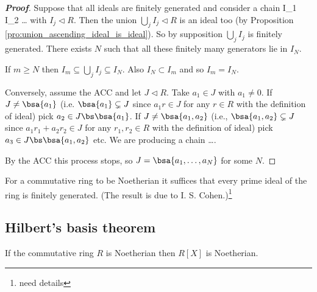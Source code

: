 \begin{proof}[\bf Proof]
Suppose that all ideals are finitely generated and consider a chain
\be
I_1 \subseteq I_2 \subseteq \dots
\ee
with $I_j \lhd R$. Then the union $\bigcup_j I_j \lhd R$ is an ideal too (by Proposition \ref{pro:union_ascending_ideal_is_ideal}). So by supposition $\bigcup_j I_j$ is finitely generated. There exists $N$ such that all these finitely many generators lie in $I_N$.

If $m \geq N$ then $I_m \subseteq \bigcup_j I_j \subseteq I_N$. Also $I_N \subset I_m$ and so $I_m = I_N$.

Conversely, assume the ACC and let $J \lhd R$. Take $a_1\in J$ with $a_1 \neq 0$. If $J \neq \bsa{a_1}$ (i.e. $\bsa{a_1} \subsetneq J$ since $a_1 r \in J$ for any $r\in R$ with the definition of ideal) pick $a_2 \in J \bs \bsa{a_1}$. If $J \neq \bsa{a_1, a_2}$ (i.e., $\bsa{a_1,a_2} \subsetneq J$ since $a_1 r_1 + a_2 r_2  \in J$ for any $r_1,r_2\in R$ with the definition of ideal) pick $a_3 \in J \bs \bsa{a_1, a_2}$ etc. We are producing a chain
\be
{} \subsetneq {} \subsetneq {} \subsetneq \dots .
\ee

By the ACC this process stops, so $J = \bsa{a_1,\dots , a_N}$ for some $N$.
\end{proof}

\begin{remark}
For a commutative ring to be Noetherian it suffices that every prime ideal of the ring is finitely generated. (The result is due to I. S. Cohen.)\footnote{need details}
\end{remark}


\subsection{Hilbert's basis theorem}

\begin{theorem}\label{thm:hilbert_basis_ring}
If the commutative ring $R$ is Noetherian then $R[X]$ is Noetherian.
\end{theorem}

